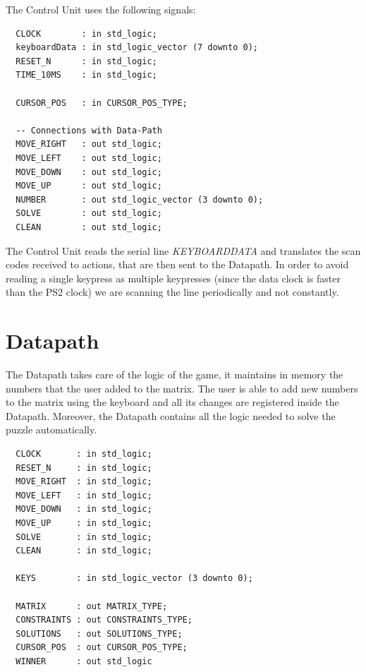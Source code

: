 \documentclass[12pt]{report}
\begin{document}
The Control Unit uses the following signals:

\begin{center}
\begin{minipage}{0.5\textwidth}
\begin{verbatim}
  CLOCK        : in std_logic;
  keyboardData : in std_logic_vector (7 downto 0);
  RESET_N      : in std_logic;
  TIME_10MS    : in std_logic;

  CURSOR_POS   : in CURSOR_POS_TYPE;

  -- Connections with Data-Path
  MOVE_RIGHT   : out std_logic;
  MOVE_LEFT    : out std_logic;
  MOVE_DOWN    : out std_logic;
  MOVE_UP      : out std_logic;
  NUMBER       : out std_logic_vector (3 downto 0);
  SOLVE        : out std_logic;
  CLEAN        : out std_logic;
\end{verbatim}
\end{minipage}
\end{center}

The Control Unit reads the serial line \textit{KEYBOARDDATA} and
translates the scan codes received to actions, that are then sent to the
Datapath. In order to avoid reading a single keypress as multiple keypresses
(since the data clock is faster than the PS2 clock) we are scanning the line
periodically and not constantly.

\newpage

\section*{Datapath}

The Datapath takes care of the logic of the game, it maintains in memory
the numbers that the user added to the matrix. The user is able to add new
numbers to the matrix using the keyboard and all its changes are registered
inside the Datapath. Moreover, the Datapath contains all the logic needed to
solve the puzzle automatically.

\begin{center}
\begin{minipage}{0.5\textwidth}
\begin{verbatim}
  CLOCK       : in std_logic;
  RESET_N     : in std_logic;
  MOVE_RIGHT  : in std_logic;
  MOVE_LEFT   : in std_logic;
  MOVE_DOWN   : in std_logic;
  MOVE_UP     : in std_logic;
  SOLVE       : in std_logic;
  CLEAN       : in std_logic;

  KEYS        : in std_logic_vector (3 downto 0);

  MATRIX      : out MATRIX_TYPE;
  CONSTRAINTS : out CONSTRAINTS_TYPE;
  SOLUTIONS   : out SOLUTIONS_TYPE;
  CURSOR_POS  : out CURSOR_POS_TYPE;
  WINNER      : out std_logic
\end{verbatim}
\end{minipage}
\end{center}
\end{document}
